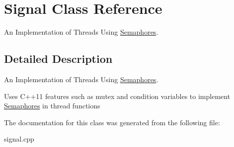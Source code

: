 \hypertarget{classSignal}{}\section{Signal Class Reference}
\label{classSignal}


An Implementation of Threads Using \hyperlink{classSemaphores}{Semaphores}.  




\subsection{Detailed Description}
An Implementation of Threads Using \hyperlink{classSemaphores}{Semaphores}. 

Uses C++11 features such as mutex and condition variables to implement \hyperlink{classSemaphores}{Semaphores} in thread functions 

The documentation for this class was generated from the following file\+:\begin{DoxyCompactItemize}
\item 
signal.\+cpp\end{DoxyCompactItemize}
